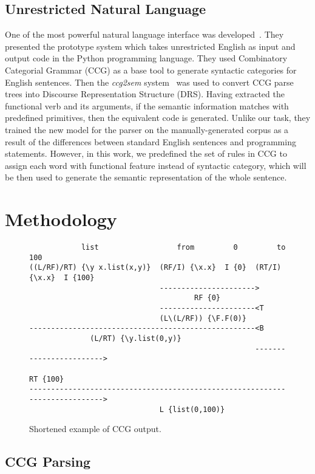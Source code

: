 \documentclass[11pt,letterpaper]{article}
\begin{document}
\subsection{Unrestricted Natural Language}
One of the most powerful natural language interface was developed~\cite{Vadas2005ProgrammingWU}. 
They presented the prototype system which takes unrestricted English as input and output code in the Python programming language. 
They used Combinatory Categorial Grammar (CCG) as a base tool to generate syntactic categories for English sentences. 
Then the \textit{ccg2sem} system~\cite{Blackburn2005RepresentationAI} was used to convert CCG parse trees into Discourse Representation Structure (DRS). 
Having extracted the functional verb and its arguments, if the semantic information matches with predefined primitives, then the equivalent code is generated. 
Unlike our task, they trained the new model for the parser on the manually-generated corpus as a result of the differences between standard English sentences and programming statements. 
However, in this work, we predefined the set of rules in CCG to assign each word with functional feature instead of syntactic category, which will be then used to generate the semantic representation of the whole sentence.

\section{Methodology}

\begin{figure*}[t]
  \small
  \begin{verbatim}
            list                  from         0         to          100
((L/RF)/RT) {\y x.list(x,y)}  (RF/I) {\x.x}  I {0}  (RT/I) {\x.x}  I {100}
                              ---------------------->
                                      RF {0}
                              ----------------------<T
                              (L\(L/RF)) {\F.F(0)}
----------------------------------------------------<B
              (L/RT) {\y.list(0,y)}
                                                    ------------------------>
                                                            RT {100}
---------------------------------------------------------------------------->
                              L {list(0,100)}
  \end{verbatim}
  \caption{\label{font-figure} Shortened example of CCG output.}
\end{figure*}

\subsection{CCG Parsing}
\end{document}
